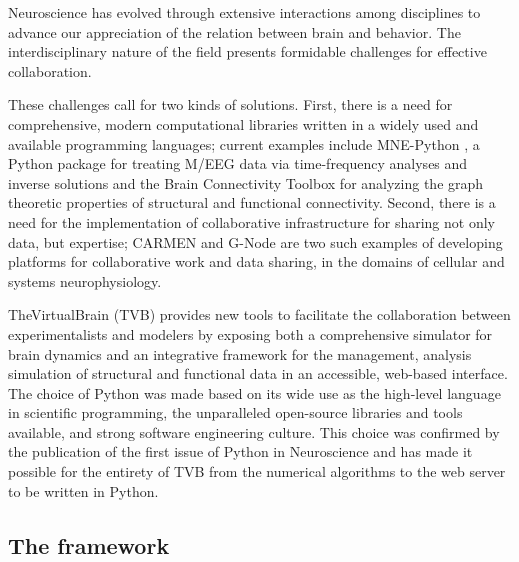 %
Neuroscience has evolved through extensive interactions among disciplines
to advance our appreciation of the relation between brain and behavior.
The interdisciplinary nature of the field presents formidable challenges
for effective collaboration.

These challenges call for two kinds of solutions. First, there is a need
for comprehensive, modern computational libraries written in a widely
used and available programming languages; current examples include MNE-Python \citep{mnepython},
a Python package for treating M/EEG data via time-frequency analyses and inverse
solutions and the Brain Connectivity
Toolbox \citep{rubinov2010complex} for analyzing the graph theoretic
properties of structural and functional connectivity. Second, there is
a need for the implementation
of collaborative infrastructure for sharing not only data, but expertise; 
CARMEN \citep{austin2011carmen} and G-Node \citep{herz2008g} are two such
examples of developing platforms for collaborative work and data sharing, 
in the domains of cellular and systems neurophysiology.

TheVirtualBrain (TVB)
provides new tools to facilitate the collaboration between experimentalists and modelers by
exposing both a comprehensive simulator for brain dynamics and an integrative 
framework for the management, analysis simulation of structural and functional
data in an accessible, web-based interface. The choice of Python was made based on
its wide use as the high-level language in scientific programming, 
the unparalleled open-source libraries and tools available, and strong software engineering 
culture.
This choice was confirmed by the publication of the first issue of Python 
in Neuroscience and has made it possible for the entirety of TVB from the 
numerical algorithms to the web server to be written in Python.

\subsection{The framework}


